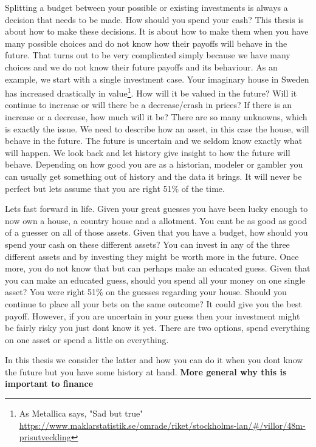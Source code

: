Splitting a budget between your possible or existing investments is always a decision that needs to be made.
How should you spend your cash?
This thesis is about how to make these decisions.
It is about how to make them when you have many possible choices and do not know how their payoffs will behave in the future.
That turns out to be very complicated simply because we have many choices and we do not know their future payoffs and its behaviour.
As an example, we start with a single investment case. 
Your imaginary house in Sweden has increased drastically in value\footnote{As Metallica says, "Sad but true" \url{https://www.maklarstatistik.se/omrade/riket/stockholms-lan/\#/villor/48m-prisutveckling}}.
How will it be valued in the future?
Will it continue to increase or will there be a decrease/crash in prices?
If there is an increase or a decrease, how much will it be?
There are so many unknowns, which is exactly the issue.
We need to describe how an asset, in this case the house, will behave in the future.
The future is uncertain and we seldom know exactly what will happen.
We look back and let history give insight to how the future will behave.
Depending on how good you are as a historian, modeler or gambler you can usually get something out of history and the data it brings.
It will never be perfect but lets assume that you are right 51\% of the time.

Lets fast forward in life.
Given your great guesses you have been lucky enough to now own a house, a country house and a allotment.
You cant be as good as good of a guesser on all of those assets.
Given that you have a budget, how should you spend your cash on these different assets?
You can invest in any of the three different assets and by investing they might be worth more in the future.
Once more, you do not know that but can perhaps make an educated guess.
Given that you can make an educated guess, should you spend all your money on one single asset?
You were right 51\% on the guesses regarding your house.
Should you continue to place all your bets on the same outcome? 
It could give you the best payoff.
However, if you are uncertain in your guess then your investment might be fairly risky you just dont know it yet.
There are two options, spend everything on one asset or spend a little on everything.

In this thesis we consider the latter and how you can do it when you dont know the future but you have some history at hand.
\textbf{More general why this is important to finance}

